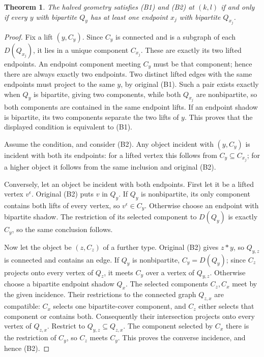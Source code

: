 \documentclass[11pt,a4paper]{article}
\newtheorem{theorem}{Theorem}
\begin{document}
\begin{theorem}\label{leaf}
The halved geometry satisfies (B1) and (B2) at $(k,l)$ if and only if
every $y$ with bipartite $Q_y$ has at least one endpoint $x_j$ with
bipartite $Q_{x_j}$.
\end{theorem}
\begin{proof}
Fix a lift $(y,C_y)$. Since $C_y$ is connected and is a subgraph of
each $D(Q_{x_j})$, it lies in a unique component $C_{x_j}$. These are
exactly its two lifted endpoints. An endpoint component meeting $C_y$
must be that component; hence there are always exactly two endpoints.
Two distinct lifted edges with the same endpoints must project to the
same $y$, by original (B1). Such a pair exists exactly when $Q_y$ is
bipartite, giving two components, while both $Q_{x_j}$ are nonbipartite,
so both components are contained in the same endpoint lifts. If an
endpoint shadow is bipartite, its two components separate the two lifts
of $y$. This proves that the displayed condition is equivalent to (B1).

Assume the condition, and consider (B2). Any object incident with
$(y,C_y)$ is incident with both its endpoints: for a lifted vertex this
follows from $C_y\subseteq C_{x_j}$; for a higher object it follows
from the same inclusion and original (B2).

Conversely, let an object be incident with both endpoints. First let
it be a lifted vertex $v^\epsilon$. Original (B2) puts $v$ in $Q_y$.
If $Q_y$ is nonbipartite, its only component contains both lifts of
every vertex, so $v^\epsilon\in C_y$. Otherwise choose an endpoint
with bipartite shadow. The restriction of its selected component to
$D(Q_y)$ is exactly $C_y$, so the same conclusion follows.

Now let the object be $(z,C_z)$ of a further type. Original (B2)
gives $z*y$, so $Q_{y,z}$ is connected and contains an edge. If $Q_y$
is nonbipartite, $C_y=D(Q_y)$; since $C_z$ projects onto every vertex
of $Q_z$, it meets $C_y$ over a vertex of $Q_{y,z}$. Otherwise choose
a bipartite endpoint shadow $Q_x$. The selected components $C_z,C_x$
meet by the given incidence. Their restrictions to the connected
graph $Q_{z,x}$ are compatible: $C_x$ selects one bipartite-cover
component, and $C_z$ either selects that component or contains both.
Consequently their intersection projects onto every vertex of
$Q_{z,x}$. Restrict to $Q_{y,z}\subseteq Q_{z,x}$. The component
selected by $C_x$ there is the restriction of $C_y$, so $C_z$ meets
$C_y$. This proves the converse incidence, and hence (B2).
\end{proof}
\end{document}
